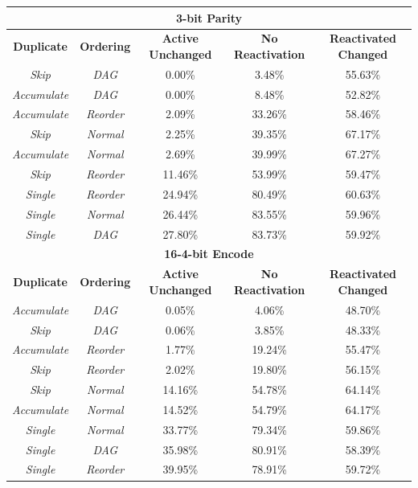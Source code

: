 \documentclass[journal]{IEEEtran}
\begin{document}
\begin{table}
	\centering
	\begin{tabular}{|c|c|c|c|c|}
	  \hline
	  \multicolumn{5}{|c|}{\textbf{3-bit Parity}} \\ \hline
\textbf{Duplicate} & \textbf{Ordering} & \textbf{Active Unchanged} & \textbf{No Reactivation} & \textbf{Reactivated Changed} \\ \hline
       \emph{Skip} &     \emph{DAG} & 0.00\% & 3.48\% & 55.63\% \\ \hline
 \emph{Accumulate} &     \emph{DAG} & 0.00\% & 8.48\% & 52.82\% \\ \hline
 \emph{Accumulate} & \emph{Reorder} & 2.09\% & 33.26\% & 58.46\% \\ \hline
   \rowcolor{Gray}
       \emph{Skip} &  \emph{Normal} & 2.25\% & 39.35\% & 67.17\% \\ \hline
 \emph{Accumulate} &  \emph{Normal} & 2.69\% & 39.99\% & 67.27\% \\ \hline
       \emph{Skip} & \emph{Reorder} & 11.46\% & 53.99\% & 59.47\% \\ \hline
     \emph{Single} & \emph{Reorder} & 24.94\% & 80.49\% & 60.63\% \\ \hline
     \emph{Single} &  \emph{Normal} & 26.44\% & 83.55\% & 59.96\% \\ \hline
     \emph{Single} &     \emph{DAG} & 27.80\% & 83.73\% & 59.92\% \\ \hline\hline

  \multicolumn{5}{|c|}{\textbf{16-4-bit Encode}} \\ \hline

\textbf{Duplicate} & \textbf{Ordering} & \textbf{Active Unchanged} & \textbf{No Reactivation} & \textbf{Reactivated Changed} \\ \hline
 \emph{Accumulate} &     \emph{DAG} & 0.05\% & 4.06\% & 48.70\% \\ \hline
       \emph{Skip} &     \emph{DAG} & 0.06\% & 3.85\% & 48.33\% \\ \hline
 \emph{Accumulate} & \emph{Reorder} & 1.77\% & 19.24\% & 55.47\% \\ \hline
       \emph{Skip} & \emph{Reorder} & 2.02\% & 19.80\% & 56.15\% \\ \hline
   \rowcolor{Gray}
       \emph{Skip} &  \emph{Normal} & 14.16\% & 54.78\% & 64.14\% \\ \hline
 \emph{Accumulate} &  \emph{Normal} & 14.52\% & 54.79\% & 64.17\% \\ \hline
     \emph{Single} &  \emph{Normal} & 33.77\% & 79.34\% & 59.86\% \\ \hline
     \emph{Single} &     \emph{DAG} & 35.98\% & 80.91\% & 58.39\% \\ \hline
     \emph{Single} & \emph{Reorder} & 39.95\% & 78.91\% & 59.72\% \\ \hline\hline


\end{tabular}
\end{table}
\end{document}
